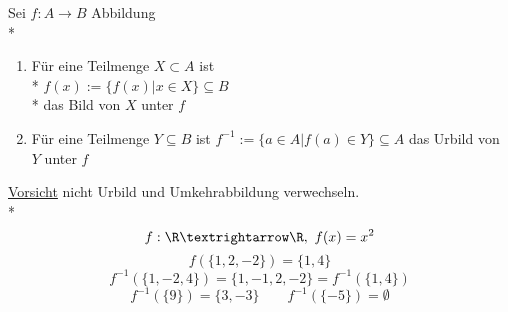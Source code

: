 Sei $f:A→B$ Abbildung\\*
\begin{enumerate}
\item{Für eine Teilmenge $X \subset A$ ist \\*
$f(x) := \{f(x) | x \in X\} \subseteq B$ \\*
das Bild von $X$ unter $f$}
\item{Für eine Teilmenge $Y \subseteq B$ ist $f^{-1}:=\{a\in A|f(a)\in Y\}\subseteq A$ das Urbild von $Y$ unter $f$}
\end{enumerate}
\ul{Vorsicht} nicht Urbild und Umkehrabbildung verwechseln.\\*
\bsp
$$f:\R→\R,\ f(x)=x^2$$
$$f(\{1, 2, -2\}) = \{1, 4\}$$
$$f^{-1}(\{1,-2,4\})=\{1,-1,2,-2\}=f^{-1}(\{1,4\})$$
$$f^{-1}(\{9\})=\{3,-3\}\qquad f^{-1}(\{-5\})=\emptyset$$

